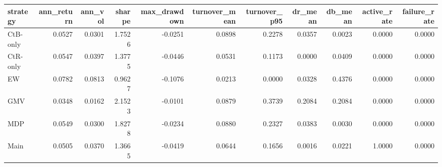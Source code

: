 \begin{tabular}{lrrrrrrrrrr}
\toprule
strategy & ann_return & ann_vol & sharpe & max_drawdown & turnover_mean & turnover_p95 & dr_mean & db_mean & active_rate & failure_rate \\
\midrule
CtB-only & 0.0527 & 0.0301 & 1.7526 & -0.0251 & 0.0898 & 0.2278 & 0.0357 & 0.0023 & 0.0000 & 0.0000 \\
CtR-only & 0.0547 & 0.0397 & 1.3775 & -0.0446 & 0.0531 & 0.1173 & 0.0000 & 0.0409 & 0.0000 & 0.0000 \\
EW & 0.0782 & 0.0813 & 0.9627 & -0.1076 & 0.0213 & 0.0000 & 0.0328 & 0.4376 & 0.0000 & 0.0000 \\
GMV & 0.0348 & 0.0162 & 2.1523 & -0.0101 & 0.0879 & 0.3739 & 0.2084 & 0.2084 & 0.0000 & 0.0000 \\
MDP & 0.0549 & 0.0300 & 1.8278 & -0.0234 & 0.0880 & 0.2327 & 0.0383 & 0.0030 & 0.0000 & 0.0000 \\
Main & 0.0505 & 0.0370 & 1.3665 & -0.0419 & 0.0644 & 0.1656 & 0.0016 & 0.0221 & 1.0000 & 0.0000 \\
\bottomrule
\end{tabular}
